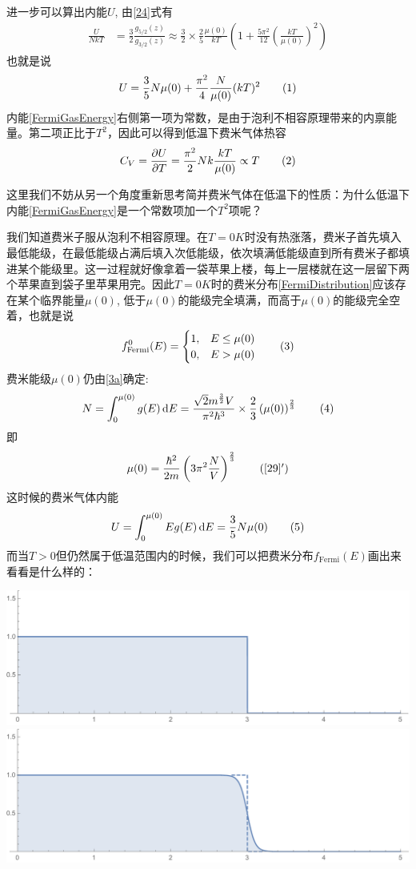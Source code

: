 \documentclass[]{article}
\begin{document}
	进一步可以算出内能$ U $, 由\eqref{24}式有
	\begin{align*}
	\frac{U}{NkT}&=\frac 32\frac{g_{5/2}(z)}{g_{3/2}(z)}\approx\frac 32\times\frac 25\frac{\mu(0)}{kT}\left(1+\frac{5\pi^2}{12}\left(\frac{kT}{\mu(0)}\right)^2\right)
	\end{align*}
	也就是说
	\[\label{FermiGasEnergy}U=\frac 35N\mu(0)+\frac{\pi^2}{4}\frac{N}{\mu(0)}(kT)^2\taghere\]
	内能\eqref{FermiGasEnergy}右侧第一项为常数，是由于泡利不相容原理带来的内禀能量。第二项正比于$ T^2 $，因此可以得到低温下费米气体热容
	\[C_V=\parDer UT=\frac{\pi^2}{2}Nk\frac{kT}{\mu(0)}\propto T\taghere\]
	
	这里我们不妨从另一个角度重新思考简并费米气体在低温下的性质：为什么低温下内能\eqref{FermiGasEnergy}是一个常数项加一个$ T^2 $项呢？
	
	我们知道费米子服从泡利不相容原理。在$ T=0\unit{K} $时没有热涨落，费米子首先填入最低能级，在最低能级占满后填入次低能级，依次填满低能级直到所有费米子都填进某个能级里。这一过程就好像拿着一袋苹果上楼，每上一层楼就在这一层留下两个苹果直到袋子里苹果用完。因此$ T=0\unit{K} $时的费米分布\eqref{FermiDistribution}应该存在某个临界能量$ \mu(0) $, 低于$ \mu(0) $的能级完全填满，而高于$ \mu(0) $的能级完全空着，也就是说
	\[f^0_{\text{Fermi}}(E)=\begin{cases}
	1,&E\le\mu(0)\\0,&E>\mu(0)
	\end{cases}\taghere\]
	费米能级$ \mu(0) $仍由\eqref{3a}确定:
	\[N=\int_0^{\mu(0)}g(E)\diff E=\frac{\sqrt{2}m^{\frac 32}V}{\pi^2\hbar^3}\times\frac 23\left(\mu(0)\right)^{\frac 23}\taghere\]
	即
	\[\mu(0)=\frac{\hbar^2}{2m}\left(3\pi^2\frac NV\right)^{\frac 23}\tag{\ref{29}$ ' $}\]
	这时候的费米气体内能
	\[U=\int_0^{\mu(0)}Eg(E)\diff E=\frac 35N\mu(0)\taghere\]
	而当$ T>0 $但仍然属于低温范围内的时候，我们可以把费米分布$ f_{\text{Fermi}}(E) $画出来看看是什么样的：
	
	\begin{multicols}{2}
		\noindent\includegraphics[width=\linewidth]{fig3L}
		\includegraphics[width=\linewidth]{fig3R}
	\end{multicols}
\end{document}
